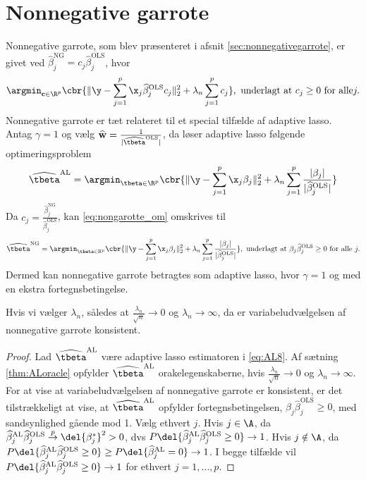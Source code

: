 \section{Nonnegative garrote} \label{sec:asymptotics_nonnegative}
Nonnegative garrote, som blev præsenteret i afsnit \ref{sec:nonnegativegarrote}, er givet ved \(\widehat{\beta}_j^\text{NG} = c_j \widehat{\beta}_j^\text{OLS}\), hvor
\begin{align}
\argmin_{\mathbf{c} \in \R^p} \cbr{\Vert \y - \sum_{j=1}^p \x_j \widehat{\beta}_j^\text{OLS} c_j \Vert_2^2 + \lambda_n \sum_{j=1}^p c_j}, \ \text{underlagt at } c_j \geq 0 \text{ for alle} j. \label{eq:nongarotte_om}
\end{align}
Nonnegative garrote er tæt relateret til et special tilfælde af adaptive lasso.
Antag \(\gamma=1\) og vælg \(\widehat{\mathbf{w}}=\frac{1}{\vert \widehat{\tbeta}^{\text{OLS}} \vert}\), da løser adaptive lasso følgende optimeringsproblem
\begin{align}
\widehat{\tbeta}^\text{AL} = \argmin_{\tbeta \in \R^p} \cbr{ \Vert \y - \sum_{j=1}^p \x_j \beta_j \Vert_2^2 + \lambda_n \sum_{j=1}^p \frac{\vert \beta_j \vert}{\vert \widehat{\beta}_j^\text{OLS} \vert}} \label{eq:AL8}
\end{align}
Da \(c_j = \frac{\widehat{\beta}_j^\text{NG}}{\widehat{\beta}_j^\text{OLS}}\), kan \eqref{eq:nongarotte_om} omskrives til
\begin{align*}
\widehat{\tbeta}^\text{NG} =\argmin_{\tbeta \in \mathbb{R}^p}  \cbr{ \Vert \y - \sum_{j=1}^p \x_j \beta_j \Vert_2^2 + \lambda_n \sum_{j=1}^p  \frac{\vert \beta_j\vert}{\vert\widehat{\beta}_j^\text{OLS}\vert}}, \ \text{underlagt at } \beta_j \widehat{\beta}_j^\text{OLS} \geq 0 \text{ for alle } j.
\end{align*}
Dermed kan nonnegative garrote betragtes som adaptive lasso, hvor \(\gamma=1\) og med en ekstra fortegnsbetingelse.
%
\begin{cor}
Hvis vi vælger \(\lambda_n\), således at \(\frac{\lambda_n}{\sqrt{n}} \rightarrow 0\) og \(\lambda_n \rightarrow \infty\), da er variabeludvælgelsen af nonnegative garrote konsistent.
\end{cor}
%
\begin{proof}
Lad \(\widehat{\tbeta}^\text{AL}\) være adaptive lasso estimatoren i \eqref{eq:AL8}.
Af sætning \ref{thm:ALoracle} opfylder \(\widehat{\tbeta}^\text{AL}\) orakelegenskaberne, hvis \(\frac{\lambda_n}{\sqrt{n}} \rightarrow 0\) og \(\lambda_n \rightarrow \infty\).
For at vise at variabeludvælgelsen af nonnegative garrote er konsistent, er det tilstrækkeligt at vise, at \(\widehat{\tbeta}^\text{AL}\) opfylder fortegnsbetingelsen, \(\beta_j \widehat{\beta}_j^\text{OLS} \geq 0 \), med sandsynlighed gående mod 1.
Vælg ethvert \(j\).
Hvis \(j \in \A\), da \(\widehat{\beta}_j^\text{AL} \widehat{\beta}_j^\text{OLS} \overset{p}{\rightarrow} \del{\beta_j^*}^2 > 0\), dvs \(P \del{\widehat{\beta}_j^\text{AL} \widehat{\beta}_j^\text{OLS} \geq 0} \rightarrow 1\).
Hvis \(j \notin \A\), da \(P \del{\widehat{\beta}_j^\text{AL} \widehat{\beta}_j^\text{OLS} \geq 0} \geq P \del{\widehat{\beta}_j^\text{AL} = 0} \rightarrow 1\).
I begge tilfælde vil \(P \del{\widehat{\beta}_j^\text{AL} \widehat{\beta}_j^\text{OLS} \geq 0} \rightarrow 1\) for ethvert \(j = 1, \ldots, p\).
\end{proof}